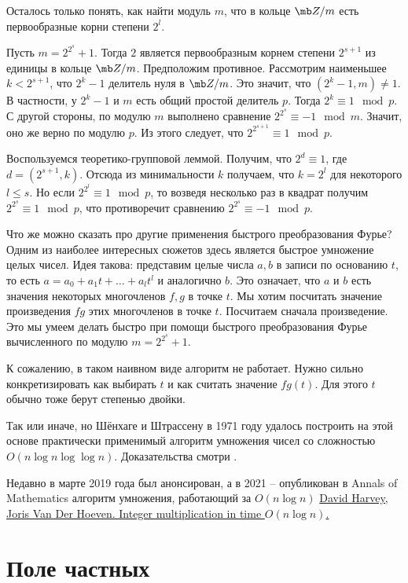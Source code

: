 Осталось только понять, как найти модуль $m$, что в кольце $\mb Z/m$ есть первообразные корни степени $2^l$.


\utv Пусть $m=2^{2^s}+1$. Тогда $2$ является первообразным корнем степени $2^{s+1}$ из единицы в кольце $\mb Z/m$. 
\eutv
\proof Предположим противное. Рассмотрим наименьшее $k<2^{s+1}$, что $2^k-1$ делитель нуля в $\mb Z/m$. Это значит, что $(2^k-1,m)\neq 1$. В частности, у $2^k-1$ и $m$ есть общий простой делитель $p$. Тогда $2^k\equiv 1 \mod p$. С другой стороны, по модулю $m$ выполнено сравнение $2^{2^s}\equiv -1 \mod m$. Значит, оно же верно по модулю $p$. Из этого следует, что $2^{2^{s+1}}\equiv 1 \mod p$.

Воспользуемся теоретико-групповой леммой. Получим, что $2^d\equiv 1$, где $d=(2^{s+1},k)$. Отсюда из минимальности $k$ получаем, что $k=2^l$ для некоторого $l\leq s$. Но если $2^{2^l} \equiv 1 \mod p$, то возведя несколько раз в квадрат получим $2^{2^s}\equiv 1 \mod p$, что противоречит сравнению $2^{2^s}\equiv -1\mod p$.   
\endproof

Что же можно сказать про другие применения быстрого преобразования Фурье? Одним из наиболее интересных сюжетов здесь является быстрое умножение целых чисел. Идея такова: представим целые  числа  $a,b$ в записи по основанию $t$, то есть $a=a_0+a_1t+\dots+a_lt^l$ и аналогично $b$. Это означает, что $a$ и $b$ есть значения некоторых многочленов $f,g$ в точке $t$. Мы хотим посчитать значение  произведения $fg$ этих многочленов в точке $t$. Посчитаем сначала произведение. Это мы умеем делать быстро при помощи быстрого преобразования Фурье вычисленного по модулю $m=2^{2^s}+1$. 

К сожалению, в таком наивном виде алгоритм не работает. Нужно сильно конкретизировать как выбирать $t$ и как считать значение $fg(t)$. Для этого $t$ обычно тоже берут степенью двойки.

Так или иначе, но Шёнхаге и Штрассену в 1971 году удалось построить на этой основе практически применимый алгоритм умножения чисел со сложностью $O(n\log n \log\log n)$. Доказательства смотри \cite[стр. 270]{AHU}.


Недавно в марте 2019 года был анонсирован, а в 2021 -- опубликован в Annals of Mathematics алгоритм умножения, работающий за $O(n\log n)$ \href{https://hal.archives-ouvertes.fr/hal-02070778/document}{David Harvey, Joris Van Der Hoeven. Integer multiplication in time $O(n \log n)$.}




\section{Поле частных}

